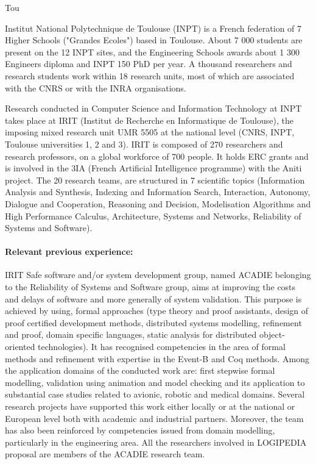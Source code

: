 \begin{sitedescription}{Tou}



Institut National Polytechnique de Toulouse (INPT) is a French federation of 7 Higher Schools ("Grandes Ecoles") based in Toulouse. About 7 000 students are present on the 12 INPT sites, and the Engineering Schools awards about 1 300 Engineers diploma and INPT 150 PhD per year. A thousand researchers and research students work within 18 research units, most of which are associated with the CNRS or with the INRA organisations.

Research conducted in Computer Science and Information Technology 
at INPT takes place at IRIT (Institut de Recherche en Informatique de Toulouse), the imposing mixed research unit UMR 5505 at the national level (CNRS, INPT, Toulouse universities 1, 2 and 3). IRIT is composed of 270 researchers and research professors, on a global workforce of 700 people. It holds ERC grants and is involved in the 3IA (French Artificial Intelligence programme) with the Aniti project. 
The 20 research teams, are structured in 7 scientific topics (Information Analysis and Synthesis, Indexing and Information Search, Interaction, Autonomy, Dialogue and Cooperation, Reasoning and Decision, Modelisation  Algorithms and High Performance Calculus,  Architecture, Systems and Networks, Reliability of Systems and Software). 



\paragraph{Relevant previous experience:} 
 IRIT Safe software and/or system development group, named ACADIE belonging to the Reliability of Systems and Software group,  aims at improving the costs and delays of software and more generally of system validation. This purpose is achieved by using,  formal approaches (type theory and proof assistants, design of proof certified development methods, distributed systems  modelling, refinement  and proof, domain specific languages, static analysis for distributed object-oriented technologies). It has recognised competencies in the area of formal methods and refinement with expertise in the Event-B and Coq methods. Among the application domains of the conducted work are: first stepwise formal modelling, validation using animation and model checking and its application to substantial case studies related to avionic, robotic and medical domains. Several research projects have supported this work either locally or at the national or European level both with academic and industrial partners. Moreover, the team has also been reinforced by competencies issued from domain modelling, particularly in the engineering area.  All the researchers involved in LOGIPEDIA proposal are members of the ACADIE research team.




\end{sitedescription}
